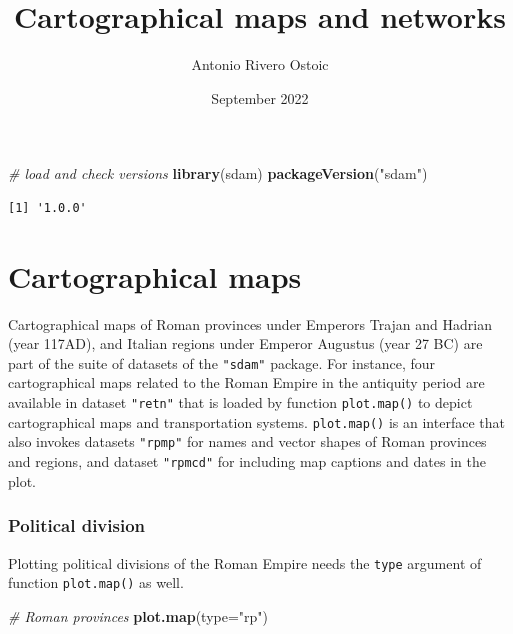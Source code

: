 \documentclass[a4paper,11pt]{memoir}
\title{Cartographical maps and networks}
\author{Antonio Rivero Ostoic}
\date{September 2022}
\newenvironment{Shaded}{\begin{snugshade}}{\end{snugshade}}
\newcommand{\CommentTok}[1]{\textcolor[rgb]{0.56,0.35,0.01}{\textit{#1}}}
\newcommand{\DataTypeTok}[1]{\textcolor[rgb]{0.13,0.29,0.53}{#1}}
\newcommand{\KeywordTok}[1]{\textcolor[rgb]{0.13,0.29,0.53}{\textbf{#1}}}
\newcommand{\NormalTok}[1]{#1}
\newcommand{\StringTok}[1]{\textcolor[rgb]{0.31,0.60,0.02}{#1}}
\begin{document}
\maketitle


\begin{Shaded}
\begin{Highlighting}[]
\CommentTok{# load and check versions}
\KeywordTok{library}\NormalTok{(sdam)}
\KeywordTok{packageVersion}\NormalTok{(}\StringTok{"sdam"}\NormalTok{)}
\end{Highlighting}
\end{Shaded}

\begin{verbatim}
[1] '1.0.0'
\end{verbatim}

\hypertarget{cartographical-maps}{%
\section{Cartographical maps}\label{cartographical-maps}}

Cartographical maps of Roman provinces under Emperors Trajan and Hadrian
(year 117AD), and Italian regions under Emperor Augustus (year 27 BC)
are part of the suite of datasets of the \texttt{"sdam"} package. For
instance, four cartographical maps related to the Roman Empire in the
antiquity period are available in dataset \texttt{"retn"} that is loaded
by function \texttt{plot.map()} to depict cartographical maps and
transportation systems. \texttt{plot.map()} is an interface that also
invokes datasets \texttt{"rpmp"} for names and vector shapes of Roman
provinces and regions, and dataset \texttt{"rpmcd"} for including map
captions and dates in the plot.

\hypertarget{political-division}{%
\subsubsection{Political division}\label{political-division}}

Plotting political divisions of the Roman Empire needs the
\texttt{\textquotesingle{}type\textquotesingle{}} argument of function
\texttt{plot.map()} as well.

\begin{Shaded}
\begin{Highlighting}[]
\CommentTok{# Roman provinces}
\KeywordTok{plot.map}\NormalTok{(}\DataTypeTok{type=}\StringTok{"rp"}\NormalTok{)}
\end{Highlighting}
\end{Shaded}
\end{document}
